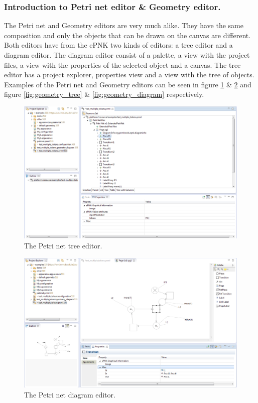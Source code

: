 \subsubsection{Introduction to Petri net editor \& Geometry editor.}
The Petri net and Geometry editors are very much alike. They have the same composition and only the objects that can be drawn on the canvas are different. Both editors have from the ePNK two kinds of editors: a tree editor and a diagram editor. The diagram editor consist of a palette, a view with the project files, a view with the properties of the selected object and a canvas. The tree editor has a project explorer, properties view and a view with the tree of objects. Examples of the Petri net and Geometry editors  can be seen in figure \ref{fig:petrinet_tree} \& \ref{fig:petrinet_diagram} and figure \ref{fig:geometry_tree} \& \ref{fig:geometry_diagram} respectively. 

\begin{figure}[H]
\begin{center}
\includegraphics[scale=0.45]{image/ui/petrinet_tree.png}
\caption{The Petri net tree editor.}
\label{fig:petrinet_tree}
\end{center}
\end{figure}

\begin{figure}[H]
\begin{center}
\includegraphics[scale=0.45]{image/ui/petrinet_diagram.png}
\caption{The Petri net diagram editor.}
\label{fig:petrinet_diagram}
\end{center}
\end{figure}


